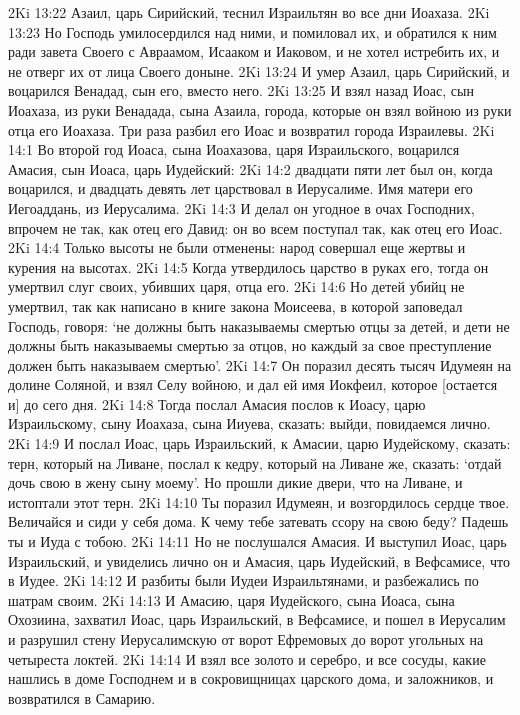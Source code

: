 2Ki 13:22  Азаил, царь Сирийский, теснил Израильтян во все дни Иоахаза.
2Ki 13:23  Но Господь умилосердился над ними, и помиловал их, и обратился к ним ради завета Своего с Авраамом, Исааком и Иаковом, и не хотел истребить их, и не отверг их от лица Своего доныне.
2Ki 13:24  И умер Азаил, царь Сирийский, и воцарился Венадад, сын его, вместо него.
2Ki 13:25  И взял назад Иоас, сын Иоахаза, из руки Венадада, сына Азаила, города, которые он взял войною из руки отца его Иоахаза. Три раза разбил его Иоас и возвратил города Израилевы.
2Ki 14:1  Во второй год Иоаса, сына Иоахазова, царя Израильского, воцарился Амасия, сын Иоаса, царь Иудейский:
2Ki 14:2  двадцати пяти лет был он, когда воцарился, и двадцать девять лет царствовал в Иерусалиме. Имя матери его Иегоаддань, из Иерусалима.
2Ki 14:3  И делал он угодное в очах Господних, впрочем не так, как отец его Давид: он во всем поступал так, как отец его Иоас.
2Ki 14:4  Только высоты не были отменены: народ совершал еще жертвы и курения на высотах.
2Ki 14:5  Когда утвердилось царство в руках его, тогда он умертвил слуг своих, убивших царя, отца его.
2Ki 14:6  Но детей убийц не умертвил, так как написано в книге закона Моисеева, в которой заповедал Господь, говоря: `не должны быть наказываемы смертью отцы за детей, и дети не должны быть наказываемы смертью за отцов, но каждый за свое преступление должен быть наказываем смертью'.
2Ki 14:7  Он поразил десять тысяч Идумеян на долине Соляной, и взял Селу войною, и дал ей имя Иокфеил, которое [остается и] до сего дня.
2Ki 14:8  Тогда послал Амасия послов к Иоасу, царю Израильскому, сыну Иоахаза, сына Ииуева, сказать: выйди, повидаемся лично.
2Ki 14:9  И послал Иоас, царь Израильский, к Амасии, царю Иудейскому, сказать: терн, который на Ливане, послал к кедру, который на Ливане же, сказать: `отдай дочь свою в жену сыну моему'. Но прошли дикие двери, что на Ливане, и истоптали этот терн.
2Ki 14:10  Ты поразил Идумеян, и возгордилось сердце твое. Величайся и сиди у себя дома. К чему тебе затевать ссору на свою беду? Падешь ты и Иуда с тобою.
2Ki 14:11  Но не послушался Амасия. И выступил Иоас, царь Израильский, и увиделись лично он и Амасия, царь Иудейский, в Вефсамисе, что в Иудее.
2Ki 14:12  И разбиты были Иудеи Израильтянами, и разбежались по шатрам своим.
2Ki 14:13  И Амасию, царя Иудейского, сына Иоаса, сына Охозиина, захватил Иоас, царь Израильский, в Вефсамисе, и пошел в Иерусалим и разрушил стену Иерусалимскую от ворот Ефремовых до ворот угольных на четыреста локтей.
2Ki 14:14  И взял все золото и серебро, и все сосуды, какие нашлись в доме Господнем и в сокровищницах царского дома, и заложников, и возвратился в Самарию.
